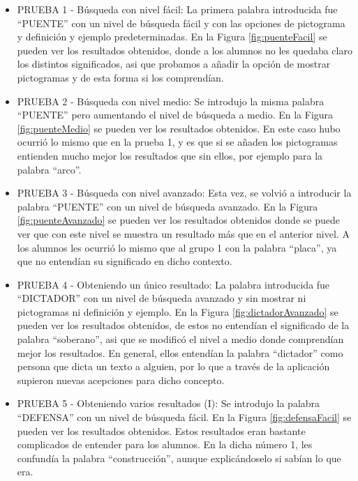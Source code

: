 \begin{itemize}
	\item PRUEBA 1 - Búsqueda con nivel fácil: La primera palabra introducida fue ``PUENTE'' con un nivel de búsqueda fácil y con las opciones de pictograma y definición y ejemplo predeterminadas. En la Figura \ref{fig:puenteFacil} se pueden ver los resultados obtenidos, donde a los alumnos no les quedaba claro los distintos significados, asi que probamos a añadir la opción de mostrar pictogramas y de esta forma si los comprendían.
	
	\item PRUEBA 2 - Búsqueda con nivel medio: Se introdujo la misma palabra ``PUENTE'' pero aumentando el nivel de búsqueda a medio. En la Figura \ref{fig:puenteMedio} se pueden ver los resultados obtenidos. En este caso hubo ocurrió lo mismo que en la prueba 1, y es que si se añaden los pictogramas entienden mucho mejor los resultados que sin ellos, por ejemplo para la palabra ``arco''.
	
	\item PRUEBA 3 - Búsqueda con nivel avanzado: Esta vez, se volvió a introducir la palabra ``PUENTE'' con un nivel de búsqueda avanzado. En la Figura  \ref{fig:puenteAvanzado} se pueden ver los resultados obtenidos donde se puede ver que con este nivel se muestra un resultado más que en el anterior nivel. A los alumnos les ocurrió lo mismo que al grupo 1 con la palabra ``placa'', ya que no entendían su significado en dicho contexto.
	
	\item PRUEBA 4 - Obteniendo un único resultado: La palabra introducida fue ``DICTADOR'' con un nivel de búsqueda avanzado y sin mostrar ni pictogramas ni definición y ejemplo. En la Figura \ref{fig:dictadorAvanzado} se pueden ver los resultados obtenidos, de estos no entendían el significado de la palabra ``soberano'', asi que se modificó el nivel a medio donde comprendían mejor los resultados. En general, ellos entendían la palabra ``dictador'' como persona que dicta un texto a alguien, por lo que a través de la aplicación supieron nuevas acepciones para dicho  concepto.

	\item PRUEBA 5 - Obteniendo varios resultados (I):  Se introdujo la palabra ``DEFENSA'' con un nivel de búsqueda fácil. En la Figura \ref{fig:defensaFacil} se pueden ver los resultados obtenidos. Estos resultados eran bastante complicados de entender para los alumnos. En la dicha número 1, les confundía la palabra ``construcción'', aunque explicándoselo si sabían lo que era.
	

\end{itemize}
